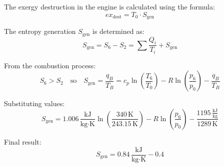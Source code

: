 The exergy destruction in the engine is calculated using the formula:  
\[
ex_{\text{dest}} = T_0 \cdot S_{\text{gen}}
\]  

The entropy generation \( S_{\text{gen}} \) is determined as:  
\[
S_{\text{gen}} = S_6 - S_2 = \sum \frac{Q_i}{T_i} + S_{\text{gen}}
\]  

From the combustion process:  
\[
S_6 > S_2 \quad \text{so} \quad S_{\text{gen}} = \frac{q_B}{T_B} = c_p \ln \left( \frac{T_6}{T_0} \right) - R \ln \left( \frac{p_6}{p_0} \right) - \frac{q_B}{T_B}
\]  

Substituting values:  
\[
S_{\text{gen}} = 1.006 \, \frac{\text{kJ}}{\text{kg·K}} \ln \left( \frac{340 \, \text{K}}{243.15 \, \text{K}} \right) - R \ln \left( \frac{p_6}{p_0} \right) - \frac{1195 \, \frac{\text{kJ}}{\text{kg}}}{1289 \, \text{K}}
\]  

Final result:  
\[
S_{\text{gen}} = 0.84 \, \frac{\text{kJ}}{\text{kg·K}} - 0.4
\]